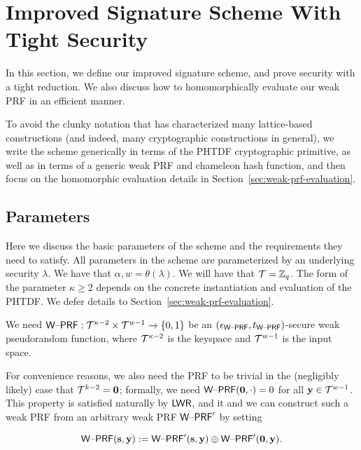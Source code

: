 \section{Improved Signature Scheme With Tight Security}
\label{sec:func-eval}



In this section, we define our improved signature scheme, and prove
security with a tight reduction. We also discuss how to 
homomorphically evaluate our weak PRF in an efficient manner. 

To avoid the clunky notation that has characterized many lattice-based
constructions (and indeed, many cryptographic constructions in general), we write
the scheme generically in terms of the PHTDF cryptographic primitive,
as well as in terms of a generic weak PRF and chameleon hash function,
and then focus on the homomorphic evaluation details in Section~\ref{sec:weak-prf-evaluation}.

\subsection{Parameters}
\label{sec:sig-params}
Here we discuss the basic parameters of the scheme and the
requirements they need to satisfy. All parameters in the scheme are
parameterized by an underlying security $\lambda$. 
We have that $\alpha,w=\theta(\lambda)$. We will have that $\mathcal{T}=\mathbb{Z}_q$.  The form of the
parameter $\kappa\geq 2$ depends on the concrete instantiation and evaluation of the
PHTDF. We defer details to
Section~\ref{sec:weak-prf-evaluation}. 

We need $\mathsf{W\text{\textendash}PRF}: \mathcal{T}^{\kappa-2} \times \mathcal{T}^{w-1} \to \{0,1\}$ be an
$(\epsilon_{\mathsf{W\text{\textendash}PRF}},t_{\mathsf{W\text{\textendash}PRF}})$-secure weak pseudorandom
function, where $\mathcal{T}^{\kappa-2}$ is the keyspace and $\mathcal{T}^{w-1}$ is the
input space. 

For convenience reasons, we also need the PRF to be trivial in the
(negligibly likely) case that $\mathcal{T}^{k-2}=\mathbf{0}$; formally, we need $\mathsf{W\text{\textendash}PRF}(\mathbf{0},\cdot)=0$ for all
$\mathbf{y} \in \mathcal{T}^{w-1}$. This property is satisfied naturally by $\mathsf{LWR}$, and it
and we can construct such a weak PRF from an arbitrary weak PRF
$\mathsf{W\text{\textendash}PRF}'$ by setting

\[\mathsf{W\text{\textendash}PRF}(\mathbf{s},\mathbf{y}):=\mathsf{W\text{\textendash}PRF}'(\mathbf{s},\mathbf{y})\oplus
\mathsf{W\text{\textendash}PRF}'(\mathbf{0},\mathbf{y}).\]



